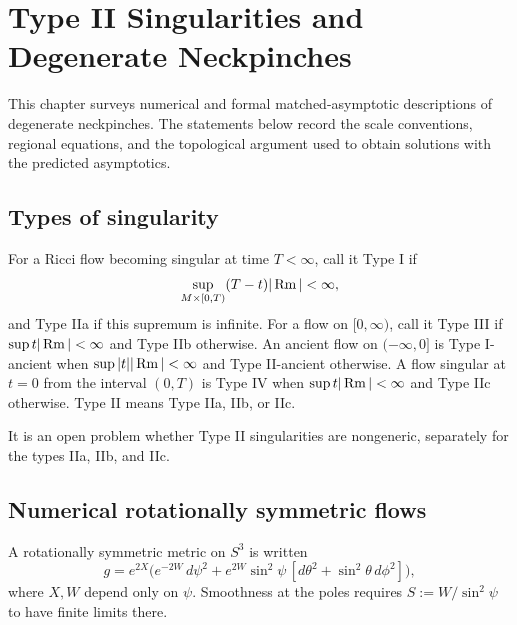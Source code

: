 \chapter{Type II Singularities and Degenerate Neckpinches}
\label{ch:chow-iv-type-ii-degenerate-neckpinches}

This chapter surveys numerical and formal matched-asymptotic descriptions of
degenerate neckpinches.  The statements below record the scale conventions,
regional equations, and the topological argument used to obtain solutions
with the predicted asymptotics.

\section{Types of singularity}

\begin{definition}
\label{def:chow-iv-singularity-types}
For a Ricci flow becoming singular at time $T<\infty$, call it Type I if
\[
 \sup_{M\times[0,T)}(T-t)|\operatorname{Rm}|<\infty,
\]
and Type IIa if this supremum is infinite.  For a flow on
$[0,\infty)$, call it Type III if $\sup t|\operatorname{Rm}|<\infty$ and Type IIb
otherwise.  An ancient flow on $(-\infty,0]$ is Type I-ancient when
$\sup |t||\operatorname{Rm}|<\infty$ and Type II-ancient otherwise.  A flow singular at
$t=0$ from the interval $(0,T)$ is Type IV when $\sup t|\operatorname{Rm}|<\infty$ and
Type IIc otherwise.  Type II means Type IIa, IIb, or IIc.
\end{definition}

\begin{remark}
\label{rem:chow-iv-type-ii-genericity-problem}
It is an open problem whether Type II singularities are nongeneric, separately
for the types IIa, IIb, and IIc.
\end{remark}

\section{Numerical rotationally symmetric flows}

\begin{definition}
\label{def:chow-iv-rotational-s3-metric}
A rotationally symmetric metric on $S^3$ is written
\[
 g=e^{2X}\bigl(e^{-2W}\,d\psi^2+e^{2W}\sin^2\psi\,[d\theta^2+
 \sin^2\theta\,d\phi^2]\bigr),
\]
where $X,W$ depend only on $\psi$.  Smoothness at the poles requires
$S:=W/\sin^2\psi$ to have finite limits there.
\end{definition}

